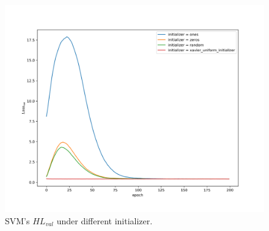 \documentclass[journal, a4paper]{IEEEtran}
\begin{document}
\begin{figure}[!hbt]
	\begin{center}
		\includegraphics[width=\columnwidth]{svm_init_val_loss}
		\caption{SVM's $HL_{val}$ under different initializer.}
		\label{fig:svm_init_val_loss}
	\end{center}
\end{figure} \par
\end{document}
